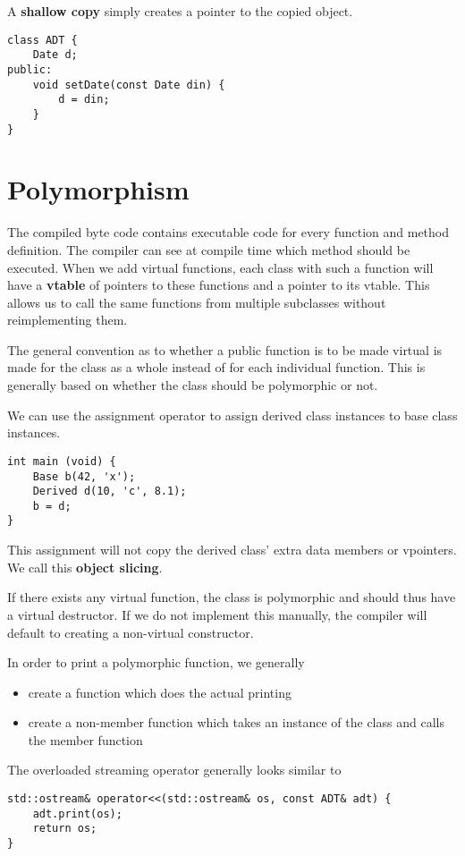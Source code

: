 \documentclass[12pt]{article}
\begin{document}
A {\bf shallow copy} simply creates a pointer to the copied object.
\begin{lstlisting}
class ADT {
    Date d;
public:
    void setDate(const Date din) {
        d = din;
    }
}
\end{lstlisting}

\section{Polymorphism}
The compiled byte code contains executable code for every function and method definition. The compiler can see at compile time which method should be executed. When we add virtual functions, each class with such a function will have a {\bf vtable} of pointers to these functions and a pointer to its vtable. This allows us to call the same functions from multiple subclasses without reimplementing them.

The general convention as to whether a public function is to be made virtual is made for the class as a whole instead of for each individual function. This is generally based on whether the class should be polymorphic or not.

We can use the assignment operator to assign derived class instances to base class instances.
\begin{lstlisting}
int main (void) {
    Base b(42, 'x');
    Derived d(10, 'c', 8.1);
    b = d;
}
\end{lstlisting}
This assignment will not copy the derived class' extra data members or vpointers. We call this {\bf object slicing}.

If there exists any virtual function, the class is polymorphic and should thus have a virtual destructor. If we do not implement this manually, the compiler will default to creating a non-virtual constructor.

In order to print a polymorphic function, we generally
\begin{itemize}
\item create a  function which does the actual printing
\item create a non-member function  which takes an instance of the class and calls the  member function
\end{itemize}

The overloaded streaming operator generally looks similar to
\begin{lstlisting}
std::ostream& operator<<(std::ostream& os, const ADT& adt) {
    adt.print(os);
    return os;
}
\end{lstlisting}
\end{document}
